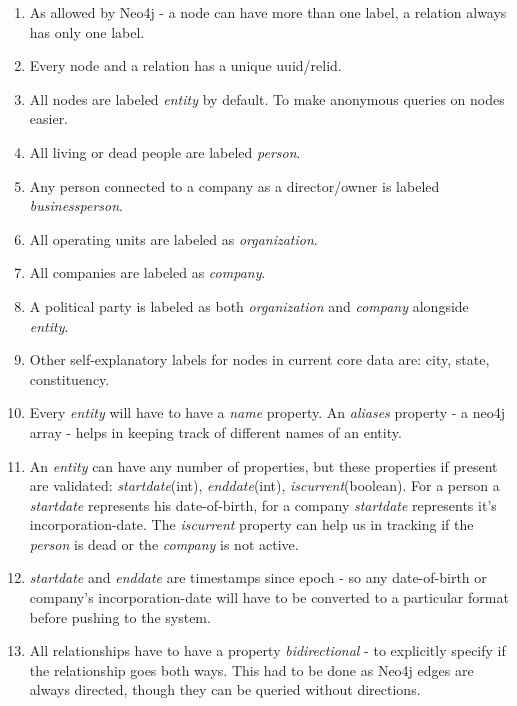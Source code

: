 \begin {enumerate}

\item As allowed by Neo4j - a node can have more than one label, a relation always has only one label.

\item Every node and a relation has a unique uuid/relid.

\item All nodes are labeled \emph{entity} by default. To make anonymous queries on nodes easier.

\item All living or dead people are labeled \emph{person}.

\item Any person connected to a company as a director/owner is labeled \emph{businessperson}.

\item All operating units are labeled as \emph{organization}.

\item All companies are labeled as \emph{company}.

\item A political party is labeled as both \emph{organization} and \emph{company} alongside \emph{entity}.

\item Other self-explanatory labels for nodes in current core data are: city, state, constituency.

\item Every \emph{entity} will have to have a \emph{name} property. An \emph{aliases} property - a neo4j array - helps in keeping track of different names of an entity.

\item An \emph{entity} can have any number of properties, but these properties if present are validated: \emph{startdate}(int), \emph{enddate}(int), \emph{iscurrent}(boolean). For a person a \emph{startdate} represents his date-of-birth, for a company \emph{startdate} represents it's incorporation-date. The \emph{iscurrent} property can help us in tracking if the \emph{person} is dead or the \emph{company} is not active.

\item \emph{startdate} and \emph{enddate} are timestamps since epoch - so any date-of-birth or company's incorporation-date will have to be converted to a particular format before pushing to the system.

\item All relationships have to have a property \emph{bidirectional} - to explicitly specify if the relationship goes both ways. This had to be done as Neo4j edges are always directed, though they can be queried without directions.


\end{enumerate}
